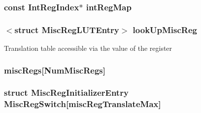 \hypertarget{structArmISA_1_1ISA_afb6be991f3bd99efccaadb4e55a09c1a}{
\subsubsection[{intRegMap}]{\setlength{\rightskip}{0pt plus 5cm}const {\bf IntRegIndex}$\ast$ {\bf intRegMap}}}
\label{structArmISA_1_1ISA_afb6be991f3bd99efccaadb4e55a09c1a}
\hypertarget{structArmISA_1_1ISA_ad38b21495dd061c39be969173cdd1c8d}{
\subsubsection[{lookUpMiscReg}]{$<$struct {\bf MiscRegLUTEntry}$>$ {\bf lookUpMiscReg}}}
\label{structArmISA_1_1ISA_ad38b21495dd061c39be969173cdd1c8d}
Translation table accessible via the value of the register \hypertarget{structArmISA_1_1ISA_a1719a90e78518ac5e323ce1fb9fe3639}{
\subsubsection[{miscRegs}]{ {\bf miscRegs}\mbox{[}{\bf NumMiscRegs}\mbox{]}}}
\label{structArmISA_1_1ISA_a1719a90e78518ac5e323ce1fb9fe3639}
\hypertarget{structArmISA_1_1ISA_af82c294831fc5f1bce99f03cacdd8884}{
\subsubsection[{MiscRegSwitch}]{\setlength{\rightskip}{0pt plus 5cm}struct {\bf MiscRegInitializerEntry} {\bf MiscRegSwitch}\mbox{[}miscRegTranslateMax\mbox{]}}}
\label{structArmISA_1_1ISA_af82c294831fc5f1bce99f03cacdd8884}
